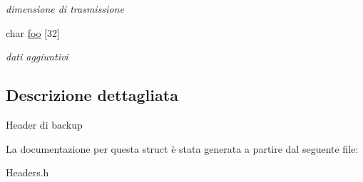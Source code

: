 \begin{DoxyCompactItemize}
\begin{DoxyCompactList}\small\item\em dimensione di trasmissione \end{DoxyCompactList}\item 
char \hyperlink{structbackupHead__t_a8d7b02cc96918b88b3842651234351d8}{foo} \mbox{[}32\mbox{]}\hypertarget{structbackupHead__t_a8d7b02cc96918b88b3842651234351d8}{}\label{structbackupHead__t_a8d7b02cc96918b88b3842651234351d8}

\begin{DoxyCompactList}\small\item\em dati aggiuntivi \end{DoxyCompactList}\end{DoxyCompactItemize}


\subsection{Descrizione dettagliata}
Header di backup 

La documentazione per questa struct è stata generata a partire dal seguente file\+:\begin{DoxyCompactItemize}
\item 
Headers.\+h\end{DoxyCompactItemize}
